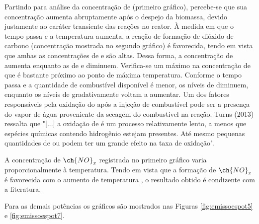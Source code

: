 Partindo para análise da concentração de  (primeiro gráfico), percebe-se que sua concentração aumenta abruptamente após o despejo da biomassa, devido justamente ao caráter transiente das reações no reator. À medida em que o tempo passa e a temperatura aumenta, a reação de formação de dióxido de carbono (concentração mostrada no segundo gráfico) é favorecida, tendo em vista que ambas as concentrações de  e  são altas. Dessa forma, a concentração de  aumenta enquanto as de  e  diminuem. Verifica-se um máximo na concentração de  que é bastante próximo ao ponto de máxima temperatura. Conforme o tempo passa e a quantidade de combustível disponível é menor, os níveis de  diminuem, enquanto os níveis de  gradativamente voltam a aumentar. Um dos fatores responsáveis pela oxidação do  após a injeção de combustível pode ser a presença do vapor de água proveniente da secagem do combustível na reação. Turns (2013) ressalta que "[...] a oxidação de  é um processo relativamente lento, a menos que espécies químicas contendo hidrogênio estejam presentes. Até mesmo pequenas quantidades de  ou  podem ter um grande efeito na taxa de oxidação". 

A concentração de $\ch{NO}_x$ registrada no primeiro gráfico varia proporcionalmente à temperatura. Tendo em vista que a formação de $\ch{NO}_x$ é favorecida com o aumento de temperatura \cite{Turns}, o resultado obtido é condizente com a literatura. 

Para as demais potências os gráficos são mostrados nas Figuras \ref{fig:emissoespot5} e \ref{fig:emissoespot7}.

